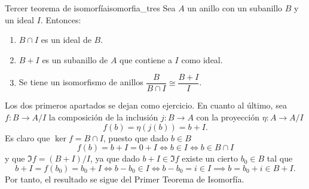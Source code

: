 \begin{theorem}{Tercer teorema de isomorfía}{isomorfia_tres}
Sea $A$ un anillo con un subanillo $B$ y un ideal $I$. Entonces:
\begin{enumerate}
    \item $B \cap I$ es un ideal de $B$.
    \item $B + I$ es un subanillo de $A$ que contiene a $I$ como ideal.
    \item Se tiene un isomorfismo de anillos $\dfrac{B}{B \cap I} \cong \dfrac{B + I}{I}$.
\end{enumerate}
\end{theorem}

\begin{proofbox}
Los dos primeros apartados se dejan como ejercicio. En cuanto al último, sea $f : B \to A/I$ la composición de la inclusión $j : B \to A$ con la proyección $\eta : A \to A/I$
\[
f(b) = \eta(j(b)) = b + I.
\]
Es claro que $\ker f = B \cap I$, puesto que dado $b \in B$
\[
f(b) = b + I = 0 + I \iff b \in I \iff b \in B \cap I
\]
y que $\Im f = (B + I)/I$, ya que dado $b + I \in \Im f$ existe un cierto $b_0 \in B$ tal que
\[
b + I = f(b_0) = b_0 + I \iff b - b_0 \in I \iff b - b_0 = i \in I \implies b = b_0 + i \in B + I.
\]
Por tanto, el resultado se sigue del Primer Teorema de Isomorfía.
\end{proofbox}


